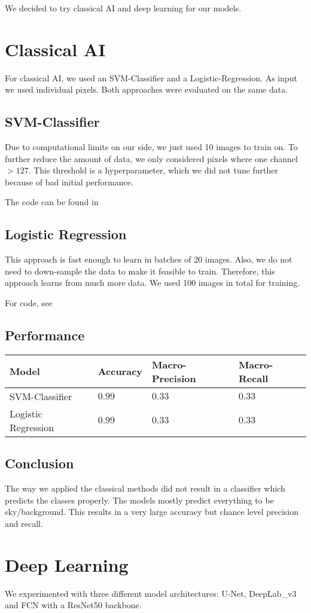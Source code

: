 We decided to try classical AI and deep learning for our models.

\section{Classical AI}
For classical AI, we used an SVM-Classifier and a Logistic-Regression. As input we used individual pixels. Both approaches were evaluated on the same data.

\subsection{SVM-Classifier}
Due to computational limits on our side, we just used 10 images to train on. To further reduce the amount of data, we only considered pixels where one channel $>127$. This threshold is a hyperparameter, which we did not tune further because of bad initial performance.

The code can be found in 

\subsection{Logistic Regression}
This approach is fast enough to learn in batches of 20 images. Also, we do not need to down-sample the data to make it feasible to train. Therefore, this approach learns from much more data. We used 100 images in total for training.

For code, see 

\subsection{Performance}
\begin{tabularx}{\linewidth}{mmmm}
    \hline
    Model               & Accuracy & Macro-Precision & Macro-Recall \\
    \hline
    SVM-Classifier      & $0.99$   & $0.33$          & $0.33$       \\
    \hline
    Logistic Regression & $0.99$   & $0.33$          & $0.33$       \\
\end{tabularx}

\subsection{Conclusion}
The way we applied the classical methods did not result in a classifier which predicts the classes properly. The models mostly predict everything to be sky/background. This results in a very large accuracy but chance level precision and recall.

\section{Deep Learning}
We experimented with three different model architectures: U-Net, DeepLab\_v3 and FCN with a ResNet50 backbone.